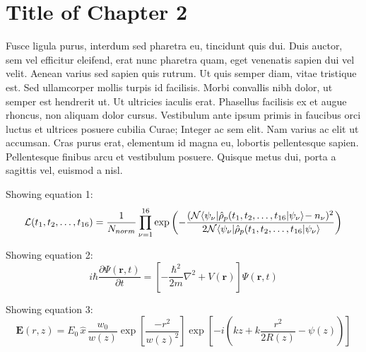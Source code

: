 
\chapter{Title of Chapter 2} %

\label{Chapter2} %




Fusce ligula purus, interdum sed pharetra eu, tincidunt quis dui. Duis auctor, sem vel efficitur eleifend, erat nunc pharetra quam, eget venenatis sapien dui vel velit. Aenean varius sed sapien quis rutrum. Ut quis semper diam, vitae tristique est. Sed ullamcorper mollis turpis id facilisis. Morbi convallis nibh dolor, ut semper est hendrerit ut. Ut ultricies iaculis erat. Phasellus facilisis ex et augue rhoncus, non aliquam dolor cursus. Vestibulum ante ipsum primis in faucibus orci luctus et ultrices posuere cubilia Curae; Integer ac sem elit. Nam varius ac elit ut accumsan. Cras purus erat, elementum id magna eu, lobortis pellentesque sapien. Pellentesque finibus arcu et vestibulum posuere. Quisque metus dui, porta a sagittis vel, euismod a nisl.
\newline

Showing equation 1:
\begin{equation}
  \label{eq1}
  \mathcal{L}(t_1, t_2, \ldots, t_{16}) = \frac{1}{N_{norm}} \prod_{\nu = 1}^{16}
  \exp \left(
    - \frac{ (\mathcal{N} \matrixel{\psi_{\nu}}{\hat\rho_p(t_1, t_2, \ldots, t_{16}}{\psi_{\nu}} - n_{\nu})^2 }
    { 2\mathcal{N}\matrixel {\psi_{\nu}} {\hat\rho_p(t_1, t_2, \ldots, t_{16}} {\psi_{\nu}} }
  \right)
\end{equation}

Showing equation 2:
\begin{equation}
  \label{eq:eq2}
  i \hbar
  \frac{\partial \Psi(\textbf{r},t)} {\partial t}
  =
  \left[
    -\frac{\hbar^2} {2m}
    \nabla^2 +
    V (\textbf{r})
  \right]
  \Psi(\textbf{r},t)
\end{equation}

Showing equation 3:
\begin{equation}
  \label{eq:GaussianBeam}
  { \mathbf E(r,z) } =
  E_0 \,
  \hat{x} \,
  \frac{w_0} {w(z)}
  \exp
  \left[
    \frac{-r^2}{w(z)^2}
  \right]
  \exp
  \left[
    -i  \!
    \left(
      kz +
      k \frac{r^2} {2R(z)} -
      \psi(z) \!
    \right)
  \right] 
\end{equation}

